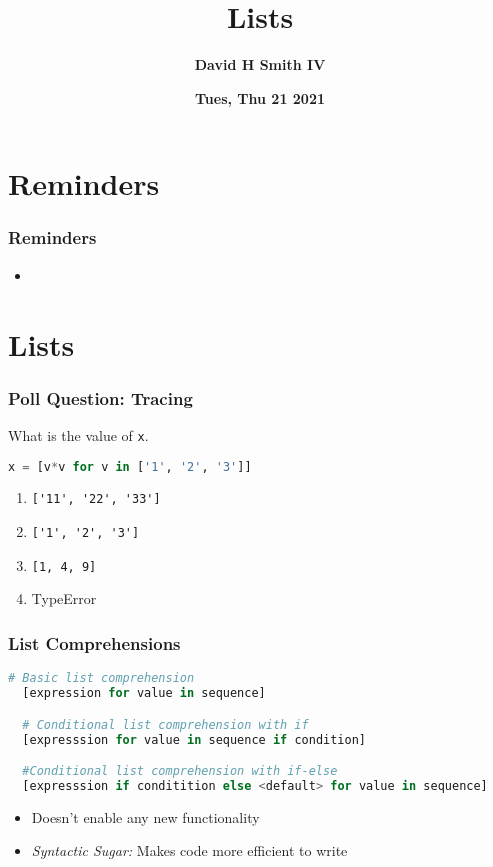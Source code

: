 \documentclass{beamer}
\title{\textbf{Lists}}
\author{\textbf{David H Smith IV}}
\institute[\textbf{UIUC}]{\textbf{University of Illinois Urbana-Champaign}}
\date{\textbf{Tues, Thu 21 2021}}
\begin{document}
\frame{\titlepage}

\section{Reminders}

%
%
\begin{frame}
  \frametitle{Reminders}
  \begin{itemize}
    \item 
  \end{itemize}
\end{frame}

\section{Lists}

%
%
\begin{frame}[fragile]
  \frametitle{Poll Question: Tracing}
  What is the value of \lstinline|x|.
  \begin{lstlisting}[language=Python, autogobble]
  x = [v*v for v in ['1', '2', '3']]
  \end{lstlisting}
  \vfill
  \begin{enumerate}[A]
    \item \lstinline|['11', '22', '33']| 
    \item \lstinline|['1', '2', '3']|
    \item \lstinline|[1, 4, 9]|
    \item TypeError
  \end{enumerate}
\end{frame}

%
%
\begin{frame}[fragile]
  \frametitle{List Comprehensions}
  \begin{lstlisting}[language=Python, autogobble]
  # Basic list comprehension
  [expression for value in sequence]

  # Conditional list comprehension with if
  [expresssion for value in sequence if condition]

  #Conditional list comprehension with if-else
  [expresssion if conditition else <default> for value in sequence]
  \end{lstlisting}
  \vfill
  \begin{itemize}
    \item Doesn't enable any new functionality 
    \item \textit{Syntactic Sugar: } Makes code more efficient to write
  \end{itemize}
\end{frame}
\end{document}
